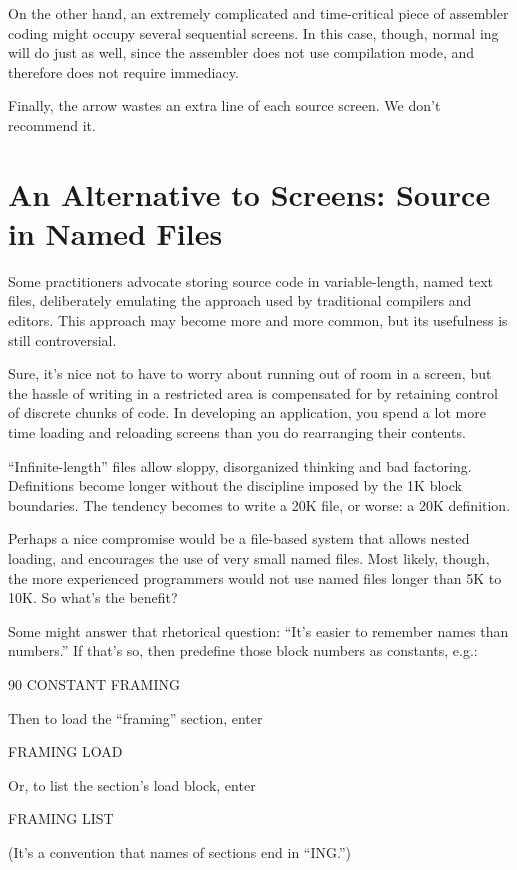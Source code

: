 On the other hand, an extremely complicated and time-critical piece
of assembler coding might occupy several sequential screens.  In this
case, though, normal ing will do just as well, since the
assembler does not use compilation mode, and therefore does not
require immediacy.

Finally, the arrow wastes an extra line of each source screen.  We
don't recommend it.

\section{An Alternative to Screens: Source in Named Files}

Some \Forth{} practitioners advocate storing source code in
variable-length, named text files, deliberately emulating the approach
used by traditional compilers and editors.  This approach may become
more and more common, but its usefulness is still controversial.

Sure, it's nice not to have to worry about running out of room in a
screen, but the hassle of writing in a restricted area is compensated
for by retaining control of discrete chunks of code.  In developing an
application, you spend a lot more time loading and reloading screens
than you do rearranging their contents.

``Infinite-length'' files allow sloppy, disorganized thinking and bad
factoring.  Definitions become longer without the discipline imposed
by the 1K block boundaries.  The tendency becomes to write a 20K file,
or worse: a 20K definition.

Perhaps a nice compromise would be a file-based system that allows
nested loading, and encourages the use of very small named files.
Most likely, though, the more experienced \Forth{} programmers would
not use named files longer than 5K to 10K.  So what's the benefit?

Some might answer that rhetorical question: ``It's easier to remember
names than numbers.'' If that's so, then predefine those block numbers
as constants, e.g.:
\begin{Code}
90 CONSTANT FRAMING
\end{Code}
Then to load the ``framing'' section, enter
\begin{Code}
FRAMING LOAD
\end{Code}
Or, to list the section's load block, enter
\begin{Code}
FRAMING LIST
\end{Code}
(It's a convention that names of sections end in ``ING.'')

